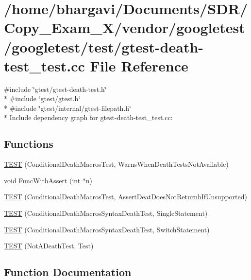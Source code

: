 \hypertarget{gtest-death-test__test_8cc}{}\section{/home/bhargavi/\+Documents/\+S\+D\+R/\+Copy\+\_\+\+Exam\+\_\+X/vendor/googletest/googletest/test/gtest-\/death-\/test\+\_\+test.cc File Reference}
\label{gtest-death-test__test_8cc}
{\ttfamily \#include \char`\"{}gtest/gtest-\/death-\/test.\+h\char`\"{}}\\*
{\ttfamily \#include \char`\"{}gtest/gtest.\+h\char`\"{}}\\*
{\ttfamily \#include \char`\"{}gtest/internal/gtest-\/filepath.\+h\char`\"{}}\\*
Include dependency graph for gtest-\/death-\/test\+\_\+test.cc\+:
\subsection*{Functions}
\begin{DoxyCompactItemize}
\item 
\hyperlink{gtest-death-test__test_8cc_a8a47cdbd11c2456db464fe098d134aa0}{T\+E\+ST} (Conditional\+Death\+Macros\+Test, Warns\+When\+Death\+Tests\+Not\+Available)
\item 
void \hyperlink{gtest-death-test__test_8cc_afe40addf0e0bb4657d18f512092ef03b}{Func\+With\+Assert} (int $\ast$n)
\item 
\hyperlink{gtest-death-test__test_8cc_acdbff3626995270fcbcc0b97e303d742}{T\+E\+ST} (Conditional\+Death\+Macros\+Test, Assert\+Deat\+Does\+Not\+Returnh\+If\+Unsupported)
\item 
\hyperlink{gtest-death-test__test_8cc_aacb04a80e0263de84b203b95cc421437}{T\+E\+ST} (Conditional\+Death\+Macros\+Syntax\+Death\+Test, Single\+Statement)
\item 
\hyperlink{gtest-death-test__test_8cc_a8d27f7b1efa4db83935274467e17f40c}{T\+E\+ST} (Conditional\+Death\+Macros\+Syntax\+Death\+Test, Switch\+Statement)
\item 
\hyperlink{gtest-death-test__test_8cc_af77aa369d8ed7d7ceefda4e7b073b05a}{T\+E\+ST} (Not\+A\+Death\+Test, Test)
\end{DoxyCompactItemize}


\subsection{Function Documentation}
